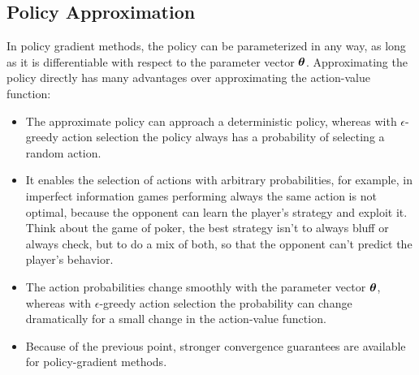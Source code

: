 \subsection{Policy Approximation}
In policy gradient methods, the policy can be parameterized in any way, as long as it is differentiable with respect to the parameter vector $\boldsymbol{\theta}$. Approximating the policy directly has many advantages over approximating the action-value function:
\begin{itemize}
    \item The approximate policy can approach a deterministic policy, whereas with $\epsilon$-greedy action selection the policy always has a probability of selecting a random action.
    \item It enables the selection of actions with arbitrary probabilities, for example, in imperfect information games performing always the same action is not optimal, because the opponent can learn the player's strategy and exploit it. Think about the game of poker, the best strategy isn't to always bluff or always check, but to do a mix of both, so that the opponent can't predict the player's behavior.
    \item The action probabilities change smoothly with the parameter vector $\boldsymbol{\theta}$, whereas with $\epsilon$-greedy action selection the probability can change dramatically for a small change in the action-value function.
    \item Because of the previous point, stronger convergence guarantees are available for policy-gradient methods.
\end{itemize}

